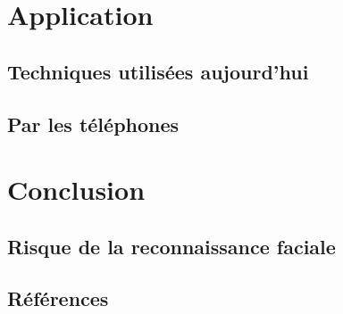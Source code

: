 \documentclass{beamer}
\theoremstyle{plain}
\theoremstyle{definition}
\begin{document}
\section{Application}
\subsection{Techniques utilisées aujourd'hui}
\subsection{Par les téléphones}

\section{Conclusion}
\subsection{Risque de la reconnaissance faciale}
\subsection{Références}

\begin{frame}
\end{frame}
\end{document}
